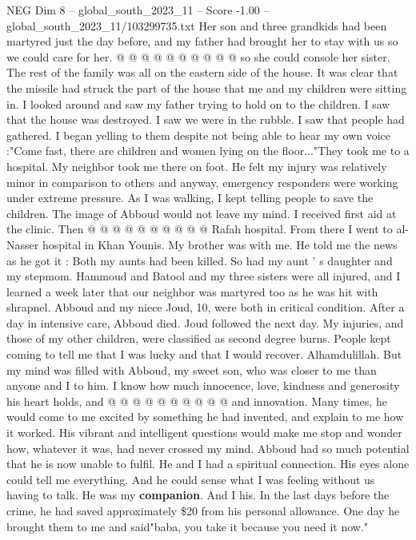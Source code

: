 \begin{textsample}{NEG Dim 8 – global\_south\_2023\_11 – Score -1.00 – global\_south\_2023\_11/103299735.txt}
Her son and three grandkids had been martyred just the day before, and my father had brought her to stay with us so we could care for her. @ @ @ @ @ @ @ @ @ @ so she could console her sister.
The rest of the family was all on the eastern side of the house.
It was clear that the missile had struck the part of the house that me and my children were sitting in.
I looked around and saw my father trying to hold on to the children.
I saw that the house was destroyed.
I saw we were in the rubble.
I saw that people had gathered.
I began yelling to them despite not being able to hear my own voice :"Come fast, there are children and women lying on the floor..."They took me to a hospital.
My neighbor took me there on foot.
He felt my injury was relatively minor in comparison to others and anyway, emergency responders were working under extreme pressure.
As I was walking, I kept telling people to save the children.
The image of Abboud would not leave my mind.
I received first aid at the clinic.
Then @ @ @ @ @ @ @ @ @ @ Rafah hospital.
From there I went to al-Nasser hospital in Khan Younis.
My brother was with me.
He told me the news as he got it : Both my aunts had been killed.
So had my aunt ' s daughter and my stepmom.
Hammoud and Batool and my three sisters were all injured, and I learned a week later that our neighbor was martyred too as he was hit with shrapnel.
Abboud and my niece Joud, 10, were both in critical condition.
After a day in intensive care, Abboud died.
Joud followed the next day.
My injuries, and those of my other children, were classified as second degree burns.
People kept coming to tell me that I was lucky and that I would recover.
Alhamdulillah.
But my mind was filled with Abboud, my sweet son, who was closer to me than anyone and I to him.
I know how much innocence, love, kindness and generosity his heart holds, and @ @ @ @ @ @ @ @ @ @ and innovation.
Many times, he would come to me excited by something he had invented, and explain to me how it worked.
His vibrant and intelligent questions would make me stop and wonder how, whatever it was, had never crossed my mind.
Abboud had so much potential that he is now unable to fulfil.
He and I had a spiritual connection.
His eyes alone could tell me everything.
And he could sense what I was feeling without us having to talk.
He was my \textbf{companion}.
And I his.
In the last days before the crime, he had saved approximately \$20 from his personal allowance.
One day he brought them to me and said"baba, you take it because you need it now."

\end{textsample}
